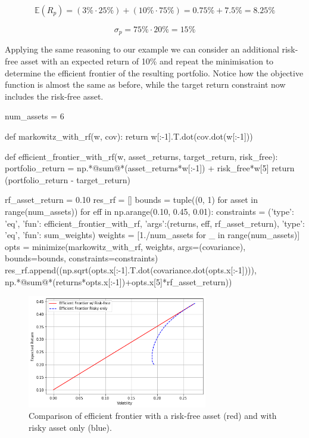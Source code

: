 \[ \mathbb{E}(R_p) = (3\% \cdot 25\%) + (10\% \cdot 75\%) = 0.75\% + 7.5\% = 8.25\% \]

\[ \sigma_p = 75\% \cdot 20\% = 15\% \]

Applying the same reasoning to our example we can consider an additional risk-free asset with an expected return of 10\% and repeat the minimisation to determine the efficient frontier of the resulting portfolio. Notice how the objective function is almost the same as before, while the target return constraint now includes the risk-free asset.

\begin{ipython}
num_assets = 6

def markowitz_with_rf(w, cov):
    return w[:-1].T.dot(cov.dot(w[:-1]))

def efficient_frontier_with_rf(w, asset_returns, target_return, risk_free):
    portfolio_return = np.*@sum@*(asset_returns*w[:-1]) + risk_free*w[5]
    return (portfolio_return - target_return)

rf_asset_return = 0.10
res_rf = []
bounds = tuple((0, 1) for asset in range(num_assets))
for eff in np.arange(0.10, 0.45, 0.01):
    constraints = ({'type': 'eq', 'fun': efficient_frontier_with_rf,
	                'args':(returns, eff, rf_asset_return)},
                   {'type': 'eq', 'fun': sum_weights})
    weights = [1./num_assets for _ in range(num_assets)]
    opts = minimize(markowitz_with_rf, weights, args=(covariance),
                    bounds=bounds, constraints=constraints)
    res_rf.append((np.sqrt(opts.x[:-1].T.dot(covariance.dot(opts.x[:-1]))),
                   np.*@sum@*(returns*opts.x[:-1])+opts.x[5]*rf_asset_return))
\end{ipython}

\begin{figure}[htb]
\centering
    \includegraphics[width=0.7\textwidth]{figures/cal.png}
    \caption{Comparison of efficient frontier with a risk-free asset (red) and with risky asset only (blue).}
    \label{fig:cal}
\end{figure}
    
